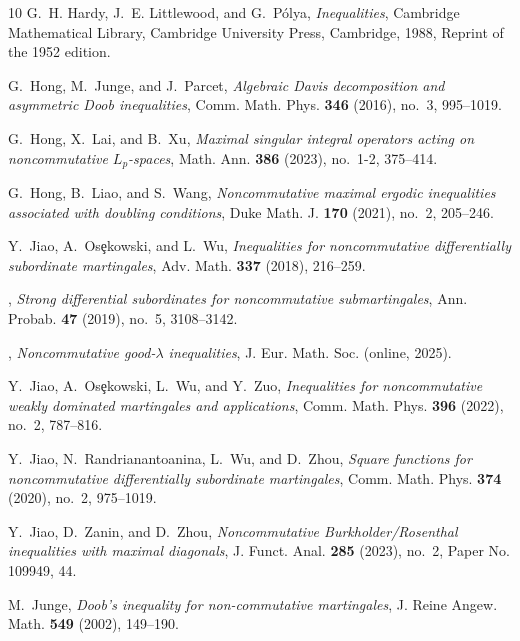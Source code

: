 \documentclass[11]{amsart}
\numberwithin{equation}{section}
\begin{document}
\begin{thebibliography}{10}
	G.~H. Hardy, J.~E. Littlewood, and G.~P\'olya, \emph{Inequalities}, Cambridge
	Mathematical Library, Cambridge University Press, Cambridge, 1988, Reprint of
	the 1952 edition. 
	
	G.~Hong, M.~Junge, and J.~Parcet, \emph{Algebraic {D}avis decomposition and
		asymmetric {D}oob inequalities}, Comm. Math. Phys. \textbf{346} (2016),
	no.~3, 995--1019. 
	
	G.~Hong, X.~Lai, and B.~Xu, \emph{Maximal singular integral operators acting on
		noncommutative {$L_p$}-spaces}, Math. Ann. \textbf{386} (2023), no.~1-2,
	375--414. 
	
	G.~Hong, B.~Liao, and S.~Wang, \emph{Noncommutative maximal ergodic
		inequalities associated with doubling conditions}, Duke Math. J. \textbf{170}
	(2021), no.~2, 205--246. 
	
	Y.~Jiao, A.~Os\c{e}kowski, and L.~Wu, \emph{Inequalities for noncommutative
		differentially subordinate martingales}, Adv. Math. \textbf{337} (2018),
	216--259. 
	
	\bysame, \emph{Strong differential subordinates for noncommutative
		submartingales}, Ann. Probab. \textbf{47} (2019), no.~5, 3108--3142.
	
	\bysame, \emph{Noncommutative good-$\lambda$ inequalities}, J. Eur. Math. Soc.
	(online, 2025).
	
	Y.~Jiao, A.~Os\c{e}kowski, L.~Wu, and Y.~Zuo, \emph{Inequalities for
		noncommutative weakly dominated martingales and applications}, Comm. Math.
	Phys. \textbf{396} (2022), no.~2, 787--816. 
	
	Y.~Jiao, N.~Randrianantoanina, L.~Wu, and D.~Zhou, \emph{Square functions for
		noncommutative differentially subordinate martingales}, Comm. Math. Phys.
	\textbf{374} (2020), no.~2, 975--1019. 
	
	Y.~Jiao, D.~Zanin, and D.~Zhou, \emph{Noncommutative {B}urkholder/{R}osenthal
		inequalities with maximal diagonals}, J. Funct. Anal. \textbf{285} (2023),
	no.~2, Paper No. 109949, 44. 
	
	M.~Junge, \emph{Doob's inequality for non-commutative martingales}, J. Reine
	Angew. Math. \textbf{549} (2002), 149--190. 
	

\end{thebibliography}
\end{document}

